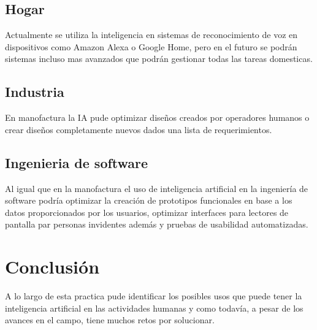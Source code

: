 \documentclass[11pt]{article}
\begin{document}
\subsection{Hogar}
\label{sec:org2f8b1ca}
Actualmente se utiliza la inteligencia en sistemas de reconocimiento de voz en
dispositivos como Amazon Alexa o Google Home, pero en el futuro se podrán 
sistemas incluso mas avanzados que podrán gestionar todas las tareas domesticas.

\subsection{Industria}
\label{sec:orgdff6612}
En manofactura la IA pude optimizar diseños creados por operadores humanos o
crear diseños completamente nuevos dados una lista de requerimientos. 

\subsection{Ingenieria de software}
\label{sec:orgce8d798}
Al igual que en la manofactura el uso de inteligencia artificial en la 
ingeniería de software podría optimizar la creación de prototipos funcionales en
base a los datos proporcionados por los usuarios, optimizar interfaces para 
lectores de pantalla par personas invidentes además y pruebas de usabilidad 
automatizadas.

\section{Conclusión}
\label{sec:org44ea214}
\begin{mdframed}
A lo largo de esta practica pude identificar los posibles usos que puede tener 
la inteligencia artificial en las actividades humanas y como todavía, a pesar
de los avances en el campo, tiene muchos retos por solucionar.
\end{mdframed}
\end{document}
